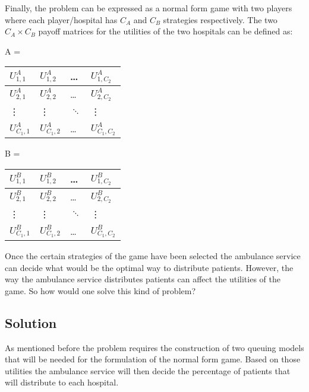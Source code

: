 Finally, the problem can be expressed as a normal form game with two players where 
each player/hospital has \( C_A \) and \( C_B \) strategies respectively. 
The two \( C_A \times C_B \) payoff matrices for the utilities of the two hospitals 
can be defined as:

\begin{table}[h]
    \centering
    \begin{minipage}{.5\linewidth}
        A = 
        \begin{tabular}{|l|l|l|l|}
            \hline
            \( U_{1,1}^A \) & \( U_{1,2}^A \) & \dots & \( U_{1,C_2}^A \) \\ \hline
            \( U_{2,1}^A \) & \( U_{2,2}^A \) & \dots & \( U_{2,C_2}^A \) \\ \hline
            \vdots & \vdots & \( \ddots \) & \vdots \\ \hline
            \( U_{C_1,1}^A \) & \( U_{C_1,2}^A \) & \dots & \( U_{C_1,C_2}^A \) \\ \hline
        \end{tabular}
    \end{minipage}%
    \begin{minipage}{.5\linewidth}
        B = 
        \begin{tabular}{|l|l|l|l|}
            \hline
            \( U_{1,1}^B \) & \( U_{1,2}^B \) & \dots & \( U_{1,C_2}^B \) \\ \hline
            \( U_{2,1}^B \) & \( U_{2,2}^B \) & \dots & \( U_{2,C_2}^B \) \\ \hline
            \vdots & \vdots & \( \ddots \) & \vdots \\ \hline
            \( U_{C_1,1}^B \) & \( U_{C_1,2}^B \) & \dots & \( U_{C_1,C_2}^B \) \\ \hline
        \end{tabular}
    \end{minipage}
\end{table}  
Once the certain strategies of the game have been selected the ambulance service 
can decide what would be the optimal way to distribute patients. 
However, the way the ambulance service distributes patients can affect the utilities 
of the game. So how would one solve this kind of problem?
 
\subsection{Solution}
As mentioned before the problem requires the construction of two queuing models 
that will be needed for the formulation of the normal form game. 
Based on those utilities the ambulance service will then decide the percentage of 
patients that will distribute to each hospital. 

